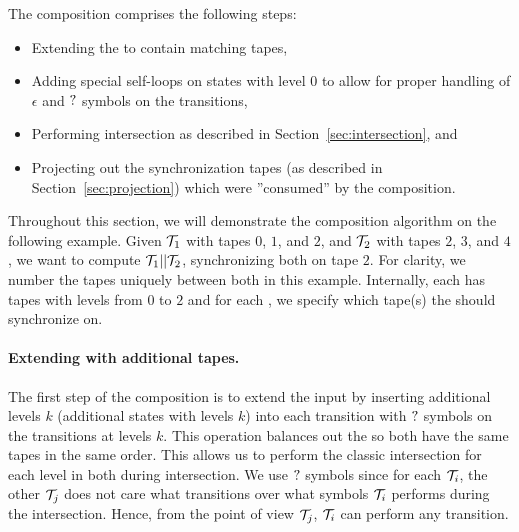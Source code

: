 The composition comprises the following steps:
\begin{itemize}
  \item Extending the \nfts to contain matching tapes,
  \item Adding special self-loops on states with level $0$ to allow for proper handling of $\epsilon$ and $?$ symbols on the transitions,
  \item Performing \nft intersection as described in Section~\ref{sec:intersection}, and
  \item Projecting out the synchronization tapes (as described in Section~\ref{sec:projection}) which were ''consumed'' by the composition.
\end{itemize}

\begin{example}
  Throughout this section, we will demonstrate the composition algorithm on the following example.
  Given \nft $\mathcal{T}_1$ with tapes $0$, $1$, and $2$, and $\mathcal{T}_2$ with tapes $2$, $3$, and $4$, we want to compute $\mathcal{T}_1 || \mathcal{T}_2$, synchronizing both \nfts on tape $2$.
  For clarity, we number the tapes uniquely between both \nfts in this example. Internally, each \nft has tapes with levels from $0$ to $2$ and for each \nft, we specify which tape(s) the \nfts should synchronize on.
\end{example}

\paragraph{Extending \nfts with additional tapes.}
The first step of the composition is to extend the input \nfts by inserting additional levels $k$ (additional states with levels $k$) into each transition with $?$ symbols on the transitions at levels $k$.
This operation balances out the \nfts so both have the same tapes in the same order.
This allows us to perform the classic \nfa intersection for each level in both \nfts during \nft intersection.
We use $?$ symbols since for each \nft $\mathcal{T}_i$, the other \nft $\mathcal{T}_j$ does not care what transitions over what symbols $\mathcal{T}_i$ performs during the intersection.
Hence, from the point of view $\mathcal{T}_j$, $\mathcal{T}_i$ can perform any transition.

